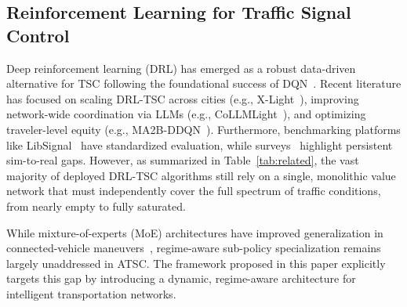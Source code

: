 \documentclass[lettersize,journal]{IEEEtran}
\begin{document}
\subsection{Reinforcement Learning for Traffic Signal Control}
Deep reinforcement learning (DRL) has emerged as a robust data-driven alternative for TSC following the foundational success of DQN~\cite{mnih2015human}. Recent literature has focused on scaling DRL-TSC across cities (e.g., X-Light~\cite{jiang2024xlight}), improving network-wide coordination via LLMs (e.g., CoLLMLight~\cite{yuan2025collmlight}), and optimizing traveler-level equity (e.g., MA2B-DDQN~\cite{zhang2026equity}). Furthermore, benchmarking platforms like LibSignal~\cite{mei2023libsignal} have standardized evaluation, while surveys~\cite{chen2022realdeal,zhao2024survey,xiao2026survey} highlight persistent sim-to-real gaps. However, as summarized in Table~\ref{tab:related}, the vast majority of deployed DRL-TSC algorithms still rely on a single, monolithic value network that must independently cover the full spectrum of traffic conditions, from nearly empty to fully saturated.

While mixture-of-experts (MoE) architectures have improved generalization in connected-vehicle maneuvers~\cite{yao2025moesac}, regime-aware sub-policy specialization remains largely unaddressed in ATSC. The framework proposed in this paper explicitly targets this gap by introducing a dynamic, regime-aware architecture for intelligent transportation networks.
\end{document}
